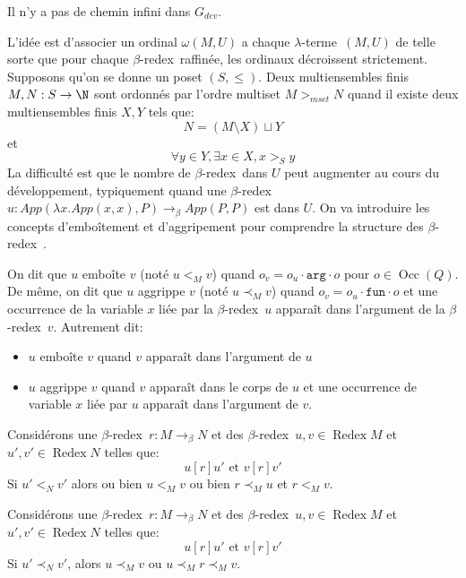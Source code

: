 \documentclass[math, info]{cours}
\def\lambdaterme{$\lambda$-terme\ }
\def\targ{\texttt{arg}}
\def\tfun{\texttt{fun}}
\def\betaredex{$\beta$-redex\ }
\DeclareMathOperator{\Redex}{Redex}
\DeclareMathOperator{\Occ}{Occ}
\begin{document}
\begin{proposition}
	Il n'y a pas de chemin infini dans $G_{dev}$.
	\label{prop:cheminfini}
\end{proposition}
L'idée est d'associer un ordinal $\omega(M, U)$ a chaque \lambdaterme $(M, U)$ de telle sorte que pour chaque \betaredex raffinée, les ordinaux décroissent strictement.
Supposons qu'on se donne un poset $(S, \leq)$.
Deux multiensembles finis $M, N: S \to \N$ sont ordonnés par l'ordre multiset $M >_{mset} N$ quand il existe deux multiensembles finis $X, Y$ tels que:
\begin{equation*}
	N = \left(M\setminus X \right)\sqcup Y
\end{equation*}
et
\begin{equation*}
	\forall y \in Y, \exists x \in X, x >_{S} y
\end{equation*}
La difficulté est que le nombre de \betaredex dans $U$ peut augmenter au cours du développement, typiquement quand une \betaredex $u: App(\lambda x. App(x, x), P) \to_{\beta} App(P, P)$ est dans $U$.
On va introduire les concepts d'emboîtement et d'aggripement pour comprendre la structure des \betaredex.
\begin{definition}
	On dit que $u$ emboîte $v$ (noté $u  <_{M} v$) quand $o_{v} = o_{u} \cdot \targ\cdot o$ pour $o \in \Occ(Q)$.
	De même, on dit que $u$ aggrippe $v$ (noté $u \prec_{M} v$) quand $o_{v} = o_{u} \cdot \tfun \cdot o$ et une occurrence de la variable $x$ liée par la \betaredex $u$ apparaît dans l'argument de la \betaredex $v$.
	Autrement dit:
	\begin{itemize}
		\item $u$ emboîte $v$ quand $v$ apparaît dans l'argument de $u$
		\item $u$ aggrippe $v$ quand $v$ apparaît dans le corps de $u$ et une occurrence de variable $x$ liée par $u$ apparaît dans l'argument de $v$.
	\end{itemize}
\end{definition}
\begin{lemme}
	Considérons une \betaredex $r: M \to_{\beta} N$ et des \betaredex $u, v \in \Redex M$ et $u', v' \in \Redex N$ telles que:
	\begin{equation*}
		u[r] u' \text{ et } v[r]v'
	\end{equation*}
	Si $u' <_{N} v'$ alors ou bien $u <_{M} v$ ou bien $r\prec_{M} u$ et $r <_{M} v$.
\end{lemme}
\begin{lemme}
	Considérons une \betaredex $r: M \to_{\beta} N$ et des \betaredex $u, v \in \Redex M$ et $u', v' \in \Redex N$ telles que:
	\begin{equation*}
		u[r] u' \text{ et } v[r]v'
	\end{equation*}
	Si $u' \prec_{N} v'$, alors $u\prec_{M} v$ ou $u\prec_{M} r\prec_{M} v$.
\end{lemme}
\end{document}
